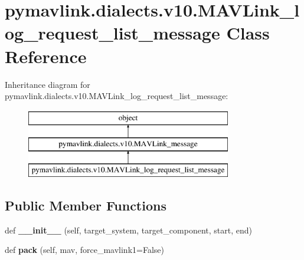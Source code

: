 \hypertarget{classpymavlink_1_1dialects_1_1v10_1_1MAVLink__log__request__list__message}{}\section{pymavlink.\+dialects.\+v10.\+M\+A\+V\+Link\+\_\+log\+\_\+request\+\_\+list\+\_\+message Class Reference}
\label{classpymavlink_1_1dialects_1_1v10_1_1MAVLink__log__request__list__message}
Inheritance diagram for pymavlink.\+dialects.\+v10.\+M\+A\+V\+Link\+\_\+log\+\_\+request\+\_\+list\+\_\+message\+:\begin{figure}[H]
\begin{center}
\leavevmode
\includegraphics[height=3.000000cm]{classpymavlink_1_1dialects_1_1v10_1_1MAVLink__log__request__list__message}
\end{center}
\end{figure}
\subsection*{Public Member Functions}
\begin{DoxyCompactItemize}
\item 
\mbox{\label{classpymavlink_1_1dialects_1_1v10_1_1MAVLink__log__request__list__message_a8b2d8be405d3679c511d177d85e85d1d}} 
def {\bfseries \+\_\+\+\_\+init\+\_\+\+\_\+} (self, target\+\_\+system, target\+\_\+component, start, end)
\item 
\mbox{\label{classpymavlink_1_1dialects_1_1v10_1_1MAVLink__log__request__list__message_a0118dadf61b580cff72e7f5533c5e950}} 
def {\bfseries pack} (self, mav, force\+\_\+mavlink1=False)
\end{DoxyCompactItemize}
